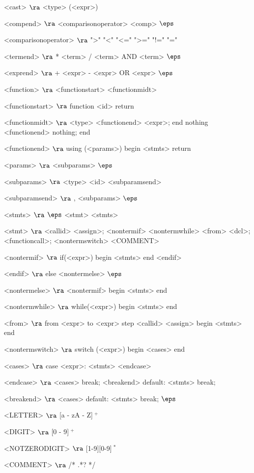 \begin{grammar}
<cast> $\ra$ <type> (<expr>)

<compend> $\ra$ <comparisonoperator> <comp>
\alt$\eps$

<comparisonoperator> $\ra$ ">"
				\alt "<"
				\alt "<="
				\alt ">="
				\alt "!="
				\alt "="

<termend> $\ra$ * <term>
\alt / <term>
\alt AND <term>
\alt$\eps$

<exprend> $\ra$ + <expr>
\alt - <expr>
\alt OR <expr>
\alt$\eps$

<function> $\ra$  <functionstart> <functionmidt>

<functionstart> $\ra$ function <id> return

<functionmidt> $\ra$ <type> <functionend> <expr>; end
\alt nothing <functionend> nothing; end

<functionend> $\ra$
using (<params>)
begin
	<stmts>
	return

<params> $\ra$ <subparams>
	\alt$\eps$

<subparams> $\ra$ <type> <id> <subparamsend>

<subparamsend> $\ra$ , <subparams>
\alt$\eps$

<stmts> $\ra$ $\eps$
	\alt <stmt> <stmts>

<stmt> $\ra$ <callid> <assign>;
	\alt <nontermif>
	\alt <nontermwhile>
	\alt <from>
	\alt <dcl>;
	\alt <functioncall>;
	\alt <nontermswitch>
	\alt <COMMENT>
	
<nontermif> $\ra$ if(<expr>)
	begin
		<stmts>
	end
	<endif>

<endif> $\ra$ 
	else <nontermelse>
	\alt$\eps$

<nontermelse> $\ra$ <nontermif>
	\alt begin
		<stmts>
	end

<nontermwhile> $\ra$ while(<expr>)
		begin
			<stmts>
		end
		
<from> $\ra$ from <expr> to <expr> step <callid> <assign>
	begin
		<stmts>
	end

<nontermswitch> $\ra$ switch (<expr>)
		begin
			<cases>
		end

<cases> $\ra$ case <expr>:
			<stmts>
		<endcase>
		
<endcase> $\ra$ <cases>
		\alt break; <breakend>
		\alt default:
			<stmts>
			break;

<breakend> $\ra$ <cases>
\alt default:
<stmts>
break;
\alt$\eps$

<LETTER> $\ra$ [a - zA - Z]$~^+$

<DIGIT> $\ra$ [0 - 9]$~^+$

<NOTZERODIGIT> $\ra$ [1-9][0-9]$~^*$

<COMMENT> $\ra$ /* .*? */


\end{grammar}